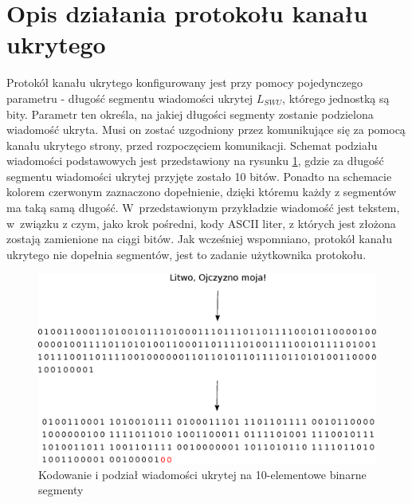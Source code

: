 \documentclass[a4paper, twoside, openright, 12pt]{report}
\begin{document}
    \section{Opis działania protokołu kanału ukrytego} \label{CHANNELDESCRIPTION}
    Protokół kanału ukrytego konfigurowany jest przy pomocy pojedynczego parametru -
    długość segmentu wiadomości ukrytej \( L_{SWU} \), którego jednostką są bity.
    Parametr ten określa, na jakiej długości segmenty zostanie podzielona wiadomość
    ukryta. Musi on zostać uzgodniony przez komunikujące się za pomocą kanału
    ukrytego strony, przed rozpoczęciem komunikacji. Schemat podziału wiadomości
    podstawowych jest przedstawiony na rysunku \ref{SEGMENTATION}, gdzie za długość
    segmentu wiadomości ukrytej przyjęte zostało 10 bitów.
    Ponadto na schemacie kolorem czerwonym zaznaczono dopełnienie, dzięki któremu
    każdy z segmentów ma taką samą długość. W~przedstawionym przykładzie wiadomość
    jest tekstem, w~związku z czym, jako krok pośredni, kody ASCII liter, z których
    jest złożona zostają zamienione na ciągi bitów. Jak wcześniej wspomniano, protokół
    kanału ukrytego nie dopełnia segmentów, jest to zadanie użytkownika protokołu.
        \begin{figure}[h]
                \centering
                \includegraphics[scale=0.8]{podzial_na_segmenty}
                \caption{Kodowanie i  podział wiadomości ukrytej na 10-elementowe binarne segmenty}
                \label{SEGMENTATION}
        \end{figure}
\end{document}
